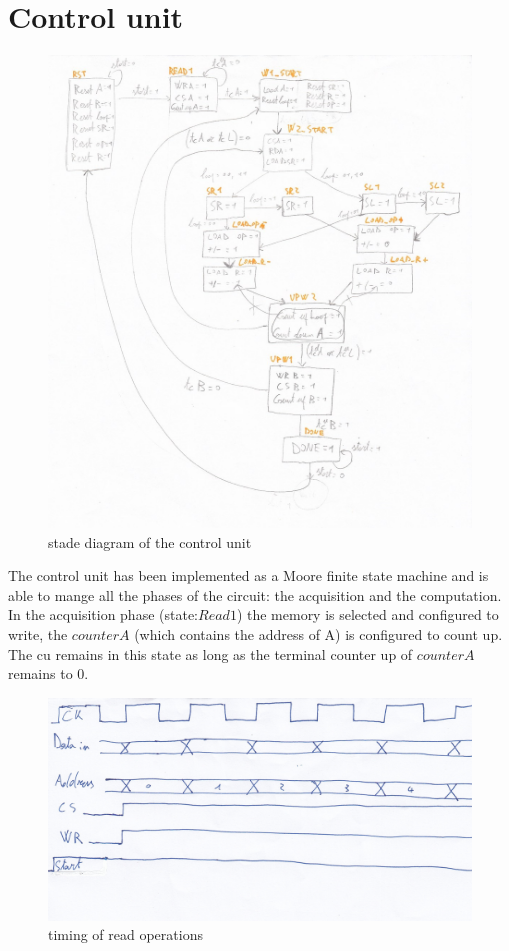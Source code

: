 \documentclass[12pt]{article}
\begin{document}
\section*{Control unit}
\begin{figure}[h]
	\centering
	\includegraphics[scale = 0.7]{immagini/fsm.jpg}
	\caption{stade diagram of the control unit}
\end{figure}

The control unit has been implemented as a Moore finite state machine and is able to mange all the phases of the circuit: the acquisition and the computation.   \\
In the acquisition phase (state:$Read1$) the memory is selected and configured to write, the $counterA$ (which contains the address of A) is configured to count up. The cu remains in this state as long as the terminal counter up of $counterA$ remains to 0. \\

\begin{figure}[h]
	\centering
	\includegraphics[scale = 0.55]{immagini/timing1.jpg}
	\caption{timing of read operations}
\end{figure}
\end{document}
